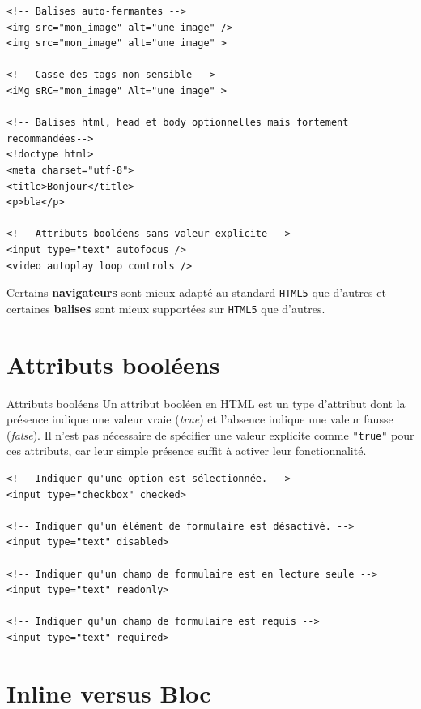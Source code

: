\documentclass{report}
\begin{document}
\begin{multicols*}{2}
\begin{lstlisting}[style=HTMLDraculaDark]
<!-- Balises auto-fermantes -->
<img src="mon_image" alt="une image" />
<img src="mon_image" alt="une image" >

<!-- Casse des tags non sensible -->
<iMg sRC="mon_image" Alt="une image" >

<!-- Balises html, head et body optionnelles mais fortement recommandées-->
<!doctype html>
<meta charset="utf-8">
<title>Bonjour</title>
<p>bla</p>

<!-- Attributs booléens sans valeur explicite -->
<input type="text" autofocus />
<video autoplay loop controls />
\end{lstlisting}

\begin{note}{}{}
Certains \textbf{navigateurs} sont mieux adapté au standard \texttt{HTML5} que d'autres et certaines 
\textbf{balises} sont mieux supportées sur \texttt{HTML5} que d'autres.     
\end{note}
        \footnotesize

\section{Attributs booléens}
\begin{Definitionx}{Attributs booléens}{}
Un attribut booléen en HTML est un type d'attribut dont la présence indique 
une valeur vraie (\textit{true}) et l'absence indique une valeur fausse 
(\textit{false}). Il n'est pas nécessaire de spécifier une valeur explicite 
comme \texttt{"true"} pour ces attributs, car leur simple présence suffit à 
activer leur fonctionnalité.   
\end{Definitionx}

\begin{lstlisting}[style=HTMLDraculaDark]
<!-- Indiquer qu'une option est sélectionnée. -->
<input type="checkbox" checked>

<!-- Indiquer qu'un élément de formulaire est désactivé. -->
<input type="text" disabled>

<!-- Indiquer qu'un champ de formulaire est en lecture seule -->
<input type="text" readonly>

<!-- Indiquer qu'un champ de formulaire est requis -->
<input type="text" required>
\end{lstlisting}



\section{Inline versus Bloc}


\end{multicols*}
\end{document}
